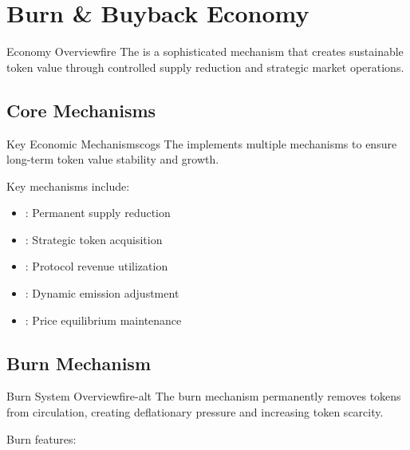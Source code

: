 
\section{Burn \& Buyback Economy}

\begin{mfai-box}{Economy Overview}{fire}
The  is a sophisticated mechanism that creates sustainable token value through controlled supply reduction and strategic market operations.
\end{mfai-box}

\subsection{Core Mechanisms}

\begin{mfai-box-learn}{Key Economic Mechanisms}{cogs}
The  implements multiple mechanisms to ensure long-term token value stability and growth.
\end{mfai-box-learn}

Key mechanisms include:

\begin{itemize}[leftmargin=*]
\item {}: Permanent supply reduction
\item {}: Strategic token acquisition
\item {}: Protocol revenue utilization
\item {}: Dynamic emission adjustment
\item {}: Price equilibrium maintenance
\end{itemize}

\subsection{Burn Mechanism}

\begin{mfai-box-build}{Burn System Overview}{fire-alt}
The burn mechanism permanently removes tokens from circulation, creating deflationary pressure and increasing token scarcity.
\end{mfai-box-build}

Burn features:

